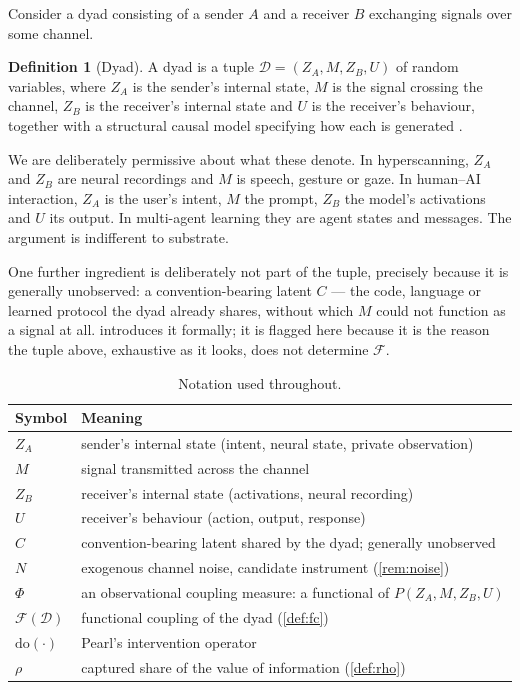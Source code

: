 \documentclass[11pt,a4paper]{article}
\theoremstyle{plain}
\theoremstyle{definition}
\newtheorem{definition}[definition]{Definition}
\theoremstyle{remark}
\newcommand{\Fc}{\mathcal{F}}
\newcommand{\Dy}{\mathcal{D}}
\newcommand{\dop}{\mathrm{do}}
\begin{document}
Consider a dyad consisting of a sender $A$ and a receiver $B$ exchanging signals over some
channel.

\begin{definition}[Dyad]\label{def:dyad}
A dyad is a tuple $\Dy = (Z_A, M, Z_B, U)$ of random variables, where $Z_A$ is the sender's
internal state, $M$ is the signal crossing the channel, $Z_B$ is the receiver's internal
state and $U$ is the receiver's behaviour, together with a structural causal model
specifying how each is generated \citep{pearl2009causality}.
\end{definition}

We are deliberately permissive about what these denote. In hyperscanning, $Z_A$ and $Z_B$ are
neural recordings and $M$ is speech, gesture or gaze. In human--AI interaction, $Z_A$ is the
user's intent, $M$ the prompt, $Z_B$ the model's activations and $U$ its output. In
multi-agent learning they are agent states and messages. The argument is indifferent to
substrate.

One further ingredient is deliberately not part of the tuple, precisely because it is
generally unobserved: a convention-bearing latent $C$ --- the code, language or learned
protocol the dyad already shares, without which $M$ could not function as a signal at all.
 introduces it formally; it is flagged here because it is the reason the
tuple above, exhaustive as it looks, does not determine $\Fc$.

\begin{table}[t]
\centering
\small
\begin{tabular}{@{}ll@{}}
\toprule
\textbf{Symbol} & \textbf{Meaning} \\
\midrule
$Z_A$ & sender's internal state (intent, neural state, private observation) \\
$M$   & signal transmitted across the channel \\
$Z_B$ & receiver's internal state (activations, neural recording) \\
$U$   & receiver's behaviour (action, output, response) \\
$C$   & convention-bearing latent shared by the dyad; generally unobserved \\
$N$   & exogenous channel noise, candidate instrument (\cref{rem:noise}) \\
$\Phi$ & an observational coupling measure: a functional of $P(Z_A,M,Z_B,U)$ \\
$\Fc(\Dy)$ & functional coupling of the dyad (\cref{def:fc}) \\
$\dop(\cdot)$ & Pearl's intervention operator \\
$\rho$ & captured share of the value of information (\cref{def:rho}) \\
\bottomrule
\end{tabular}
\caption{Notation used throughout.}
\label{tab:notation}
\end{table}
\end{document}
